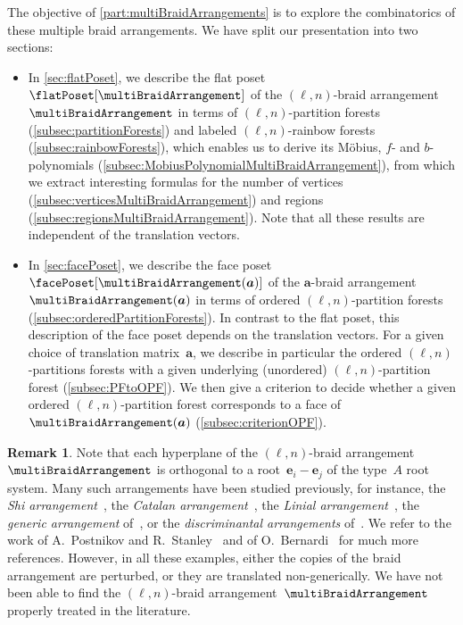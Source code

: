 \documentclass{amsart}
\newcommand{\darkblue}{\color{darkblue}} %
\theoremstyle{definition}
\newtheorem{remark}[theorem]{Remark}
\renewcommand{\b}[1]{{\boldsymbol{#1}}} %
\newcommand{\defn}[1]{\textsl{\darkblue #1}} %
\renewcommand{\b}[1]{\boldsymbol{#1}} %
\begin{document}
The objective of \cref{part:multiBraidArrangements} is to explore the combinatorics of these multiple braid arrangements.
We have split our presentation into two sections:
\begin{itemize}
\item In \cref{sec:flatPoset}, we describe the flat poset~$\flatPoset[\multiBraidArrangement]$ of the $(\ell,n)$-braid arrangement~$\multiBraidArrangement$ in terms of $(\ell,n)$-partition forests (\cref{subsec:partitionForests}) and labeled $(\ell,n)$-rainbow forests (\cref{subsec:rainbowForests}), which enables us to derive its M\"obius, $f$- and $b$- polynomials (\cref{subsec:MobiusPolynomialMultiBraidArrangement}), from which we extract interesting formulas for the number of vertices (\cref{subsec:verticesMultiBraidArrangement}) and regions (\cref{subsec:regionsMultiBraidArrangement}). Note that all these results are independent of the translation vectors.
\item In \cref{sec:facePoset}, we describe the face poset~$\facePoset[\multiBraidArrangement(\b{a})]$ of the $\b{a}$-braid  arrangement~$\multiBraidArrangement(\b{a})$ in terms of ordered $(\ell,n)$-partition forests (\cref{subsec:orderedPartitionForests}). In contrast to the flat poset, this description of the face poset depends on the translation vectors. For a given choice of translation matrix~$\b{a}$, we describe in particular the ordered $(\ell,n)$-partitions forests with a given underlying (unordered) $(\ell,n)$-partition forest (\cref{subsec:PFtoOPF}). We then give a criterion to decide whether a given ordered $(\ell,n)$-partition forest corresponds to a face of~$\multiBraidArrangement(\b{a})$ (\cref{subsec:criterionOPF}).
\end{itemize}

\begin{remark}
Note that each hyperplane of the $(\ell,n)$-braid arrangement~$\multiBraidArrangement$ is orthogonal to a root~$\b{e}_i-\b{e}_j$ of the type~$A$ root system.
Many such arrangements have been studied previously, for instance, the \defn{Shi arrangement}~\cite{Shi1, Shi2}, the \defn{Catalan arrangement}~\cite[Sect.~7]{PostnikovStanley}, the \defn{Linial arrangement}~\cite[Sect.~8]{PostnikovStanley}, the \defn{generic arrangement} of~\cite[Sect.~5]{PostnikovStanley}, or the \defn{discriminantal arrangements} of~\cite{ManinSchechtman,BayerBrandt}.
We refer to the work of A.~Postnikov and R.~Stanley~\cite{PostnikovStanley} and of O.~Bernardi~\cite{Bernardi} for much more references.
However, in all these examples, either the copies of the braid arrangement are perturbed, or they are translated non-generically.
We have not been able to find the $(\ell,n)$-braid arrangement~$\multiBraidArrangement$ properly treated in the literature.
\end{remark}
\end{document}
